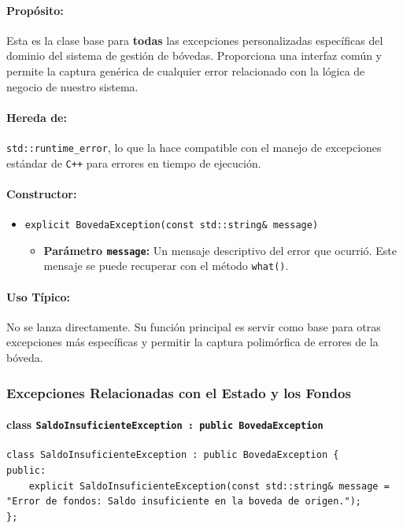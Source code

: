 \documentclass{article}
\newcommand{\inlinecode}[1]{\texttt{#1}}
\begin{document}
\paragraph*{Propósito:} Esta es la clase base para \textbf{todas} las excepciones personalizadas espec\'ificas del dominio del sistema de gesti\'on de b\'ovedas. Proporciona una interfaz com\'un y permite la captura gen\'erica de cualquier error relacionado con la l\'ogica de negocio de nuestro sistema.

\paragraph*{Hereda de:} \inlinecode{std::runtime_error}, lo que la hace compatible con el manejo de excepciones est\'andar de \inlinecode{C++} para errores en tiempo de ejecuci\'on.

\paragraph*{Constructor:}
\begin{itemize}
    \item \inlinecode{explicit BovedaException(const std::string\& message)}
    \begin{itemize}
        \item \textbf{Parámetro \inlinecode{message}:} Un mensaje descriptivo del error que ocurri\'o. Este mensaje se puede recuperar con el m\'etodo \inlinecode{what()}.
    \end{itemize}
\end{itemize}

\paragraph*{Uso Típico:} No se lanza directamente. Su funci\'on principal es servir como base para otras excepciones m\'as espec\'ificas y permitir la captura polim\'orfica de errores de la b\'oveda.

\subsubsection*{Excepciones Relacionadas con el Estado y los Fondos}

\paragraph*{\textbf{class \inlinecode{SaldoInsuficienteException : public BovedaException}}}
\vspace{2mm} %
\begin{lstlisting}
class SaldoInsuficienteException : public BovedaException {
public:
    explicit SaldoInsuficienteException(const std::string& message = "Error de fondos: Saldo insuficiente en la boveda de origen.");
};
\end{lstlisting}
\end{document}
